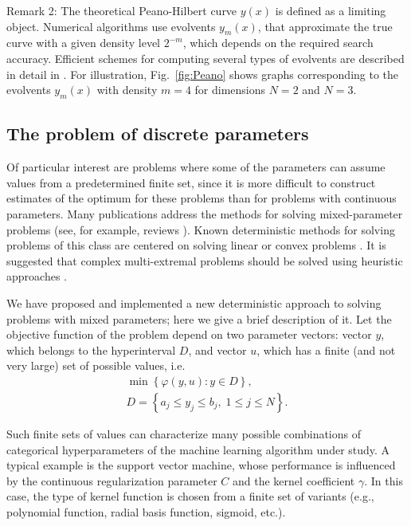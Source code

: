 \documentclass[preprint,12pt]{elsarticle}
\begin{document}
Remark 2: The theoretical Peano-Hilbert curve $y(x)$ is defined as a limiting object. Numerical algorithms use evolvents $y_m(x)$, that approximate the true curve with a given density level $2^{-m}$, which depends on the required search accuracy. Efficient schemes for computing several types of evolvents are described in detail in \cite{Sergeyev2013}. For illustration, Fig.~\ref{fig:Peano} shows graphs corresponding to the evolvents $y_m(x)$ with density $m=4$ for dimensions $N=2$ and $N=3$.

\subsection{The problem of discrete parameters}
\label{sec_discr} 

Of particular interest are problems where some of the parameters can assume values from a predetermined finite set, since it is more difficult to construct estimates of the optimum for these problems than for problems with continuous parameters. Many publications address the methods for solving mixed-parameter problems (see, for example, reviews \cite{Burer2012,Boukouvala2016}). Known deterministic methods for solving problems of this class are centered on solving linear or convex problems \cite{Lee2012}. It is suggested that complex multi-extremal problems should be solved using heuristic approaches \cite{Belotti2013}. 

We have proposed and implemented a new deterministic approach to solving problems with mixed parameters; here we give a brief description of it. 
Let the objective function of the problem depend on two parameter vectors: vector $y$, which belongs to the hyperinterval $D$, and vector $u$, which has a finite (and not very large) set of possible values, i.e.
\begin{gather}\label{problem_i}
\min{\left\{ \varphi(y,u) : y\in D \right\}},\\
D=\left\{a_j \leq y_j \leq b_j, \; 1\leq j \leq N \right\}.\nonumber
\end{gather}

Such finite sets of values can characterize many possible combinations of categorical hyperparameters of the machine learning algorithm under study. A typical example is the support vector machine, whose performance is influenced by the continuous regularization parameter $C$ and the kernel coefficient $\gamma$. In this case, the type of kernel function is chosen from a finite set of variants (e.g., polynomial function, radial basis function, sigmoid, etc.). 
\end{document}
